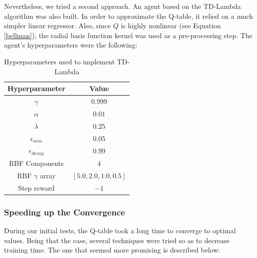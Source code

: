 \documentclass[11pt,twoside]{article}
\begin{document}
Nevertheless, we tried a second approach. An agent based on the TD-Lambda algorithm was also built. In order to approximate the Q-table, it relied on a much simpler linear regressor. Also, since $Q$ is highly nonlinear (see Equation \ref{bellman}), the radial basis function kernel was used as a pre-processing step. The agent's hyperparameters were the following:

\begin{table}[H]
	\begin{center}
		\begin{tabular}{|c |c|} 
			\hline
			Hyperparameter & Value \\
			\hline\hline
			$\gamma$ & $0.999$ \\
			$\alpha$ & $0.01$ \\
			$\lambda$ & $0.25$ \\
			$\epsilon_{min}$ & $0.05$ \\
			$\epsilon_{decay}$ & $0.99$ \\
			RBF Components & $4$ \\
			RBF $\gamma$ array & $[5.0, 2.0, 1.0, 0.5]$ \\
			Step reward & $-1$ \\
			\hline
		\end{tabular}
		\caption{Hyperparameters used to implement TD-Lambda}
	\end{center}
\end{table}

\subsubsection{Speeding up the Convergence}\label{speed_conv}

During our initial tests, the Q-table took a long time to converge to optimal values. Being that the case, several techniques were tried so as to decrease training time. The one that seemed more promising is described below:
\end{document}
